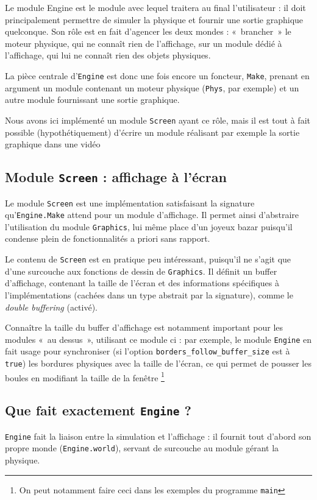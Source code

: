 \documentclass[a4paper]{scrartcl}
\begin{document}
Le module Engine est le module avec lequel traitera au final
l'utilisateur : il doit principalement permettre de simuler la
physique et fournir une sortie graphique quelconque. Son rôle est en
fait d'agencer les deux mondes : «~brancher~» le moteur physique, qui
ne connaît rien de l'affichage, sur un module dédié à l'affichage, qui
lui ne connaît rien des objets physiques.

La pièce centrale d'\texttt{Engine} est donc une fois encore un
foncteur, \texttt{Make}, prenant en argument un module contenant un
moteur physique (\texttt{Phys}, par exemple) et un autre module
fournissant une sortie graphique.

Nous avons ici implémenté un module \texttt{Screen} ayant ce rôle,
mais il est tout à fait possible (hypothétiquement) d'écrire un module
réalisant par exemple la sortie graphique dans une vidéo

\subsection{Module \texttt{Screen} : affichage à l'écran}
Le module \texttt{Screen} est une implémentation satisfaisant la
signature qu'\texttt{Engine.Make} attend pour un module
d'affichage. Il permet ainsi d'abstraire l'utilisation du module
\texttt{Graphics}, lui même place d'un joyeux bazar puisqu'il condense
plein de fonctionnalités a priori sans rapport.

Le contenu de \texttt{Screen} est en pratique peu intéressant,
puisqu'il ne s'agit que d'une surcouche aux fonctions de dessin de
\texttt{Graphics}. Il définit un buffer d'affichage, contenant la
taille de l'écran et des informations spécifiques à l'implémentations
(cachées dans un type abstrait par la signature), comme le
\emph{double buffering} (activé).

Connaître la taille du buffer d'affichage est notamment important pour
les modules «~au dessus~», utilisant ce module ci : par exemple, le
module \texttt{Engine} en fait usage pour synchroniser (si l'option
\texttt{borders\_follow\_buffer\_size} est à \texttt{true}) les bordures
physiques avec la taille de l'écran, ce qui permet de pousser les
boules en modifiant la taille de la fenêtre \footnote{On peut
  notamment faire ceci dans les exemples du programme \texttt{main}}

\subsection{Que fait exactement \texttt{Engine} ?}
\texttt{Engine} fait la liaison entre la simulation et l'affichage :
il fournit tout d'abord son propre monde (\texttt{Engine.world}),
servant de surcouche au module gérant la physique.
\end{document}
